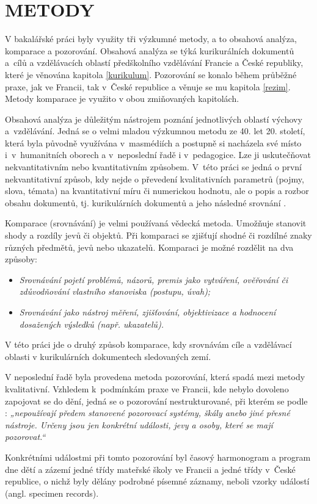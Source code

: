 
\chapter{METODY}
\label{metody}

V bakalářské práci byly využity tři výzkumné metody, a to obsahová analýza, komparace a pozorování. Obsahová analýza se týká kurikurálních dokumentů a cílů a vzdělávacích oblastí předškolního vzdělávání Francie a České republiky, které je věnována kapitola \ref{kurikulum}. Pozorování se konalo během průběžné praxe, jak ve Francii, tak v České republice a věnuje se mu kapitola \ref{rezim}. Metody komparace je využito v obou zmiňovaných kapitolách. 

Obsahová analýza je důležitým nástrojem poznání jednotlivých oblastí výchovy a vzdělávání. Jedná se o velmi mladou výzkumnou metodu ze 40. let 20. století, která byla původně využívána v masmédiích a postupně si nacházela své místo i v humanitních oborech a v neposlední řadě i v pedagogice. Lze ji uskutečňovat nekvantitativním nebo kvantitativním způsobem. V této práci se jedná o první nekvantitativní způsob, kdy nejde o převedení kvalitativních parametrů (pojmy, slova, témata) na kvantitativní míru či numerickou hodnotu, ale o popis a rozbor obsahu dokumentů, tj. kurikulárních dokumentů a jeho následné srovnání \citep{Gavora08}.

Komparace (srovnávání) je velmi používaná vědecká metoda. Umožňuje stanovit shody a rozdíly jevů či objektů. Při komparaci se zjišťují shodné či rozdílné znaky různých předmětů, jevů nebo ukazatelů. 
Komparaci je možné rozdělit na dva způsoby:
\begin{itemize}
\item []\textit{Srovnávání pojetí problémů, názorů, premis jako vytváření, ověřování či zdůvodňování vlastního stanoviska (postupu, úvah);}
\item []\textit{Srovnávání jako nástroj měření, zjišťování, objektivizace a hodnocení dosažených výsledků (např. ukazatelů).} \citep[s.~19]{Siroky}
\end{itemize}
V této práci jde o druhý způsob komparace, kdy srovnávám cíle a vzdělávací oblasti v kurikulárních dokumentech sledovaných zemí.  

V neposlední řadě byla provedena metoda pozorování, která spadá mezi metody kvalitativní. Vzhledem k podmínkám praxe ve Francii, kde nebylo dovoleno zapojovat se do dění, jedná se o pozorování nestrukturované, při kterém se podle \citet[s.~17]{Gavora96}: \textit{„nepoužívají předem stanovené pozorovací systémy, škály anebo jiné přesné nástroje. Určeny jsou jen konkrétní události, jevy a osoby, které se mají pozorovat.“} 

Konkrétními událostmi při tomto pozorování byl časový harmonogram a program dne dětí a zázemí jedné třídy mateřské školy ve Francii a jedné třídy v České republice, o nichž byly dělány podrobné písemné záznamy, neboli vzorky událostí (angl. specimen records). 
